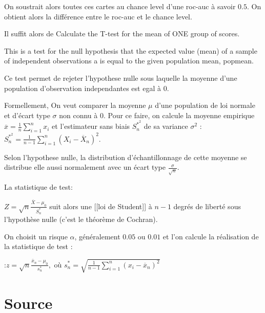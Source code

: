 On soustrait alors toutes ces cartes au chance level d'une roc-auc à savoir $0.5$. On obtient alors la différence entre le roc-auc et le chance level.

Il suffit alors de Calculate the T-test for the mean of ONE group of scores.

This is a test for the null hypothesis that the expected value (mean) of a sample of independent observations a is equal to the given population mean, popmean.

Ce test permet de rejeter l'hypothese nulle sous laquelle la moyenne d'une population d'observation independantes est egal à $0$.

Formellement,
On veut comparer la moyenne $\mu$ d'une population de loi normale et d’écart type $\sigma$ non connu à $0$. Pour ce faire, on calcule la moyenne empirique $\overline{x} = \frac{1}{n}\sum_{i=1}^{n}x_i$ et l'estimateur  sans biais $S^{\ast ^2}_n$ de sa variance $\sigma^2$
:$S^{\ast ^2}_n = \frac{1}{n-1}\sum\limits_{i=1}^n (X_i - \overline X_n )^2$.

Selon l’hypothese nulle, la distribution d’échantillonnage de cette moyenne se distribue elle aussi normalement avec un écart type $\frac{\sigma}{\sqrt{n}}$.

La statistique de test:

$ Z = \sqrt{n}\frac{\overline{X} - \mu_0}{S^{\ast}_n}$
suit alors une [[loi de Student]] à $n-1$ degrés de liberté sous l'hypothèse nulle (c'est le théorème de Cochran).

On choisit un risque $\alpha$, généralement $0.05$ ou $0.01$ et l'on calcule la réalisation de la statistique de test :

:$z = \sqrt{n}\frac{\overline{x}_n - \mu_0}{s^{\ast}_n},$ où $s^{\ast}_n =\sqrt{\frac{1}{n-1}\sum\limits_{i=1}^n (x_i - \overline x_n )^2} $






\chapter{Source}